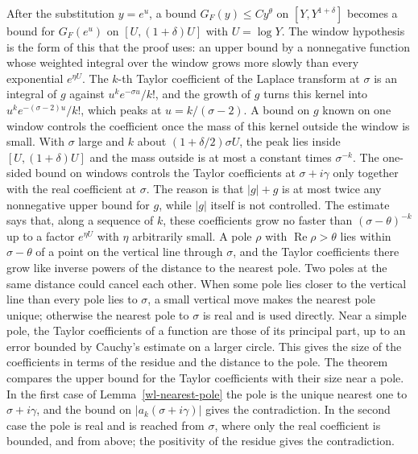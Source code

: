 After the substitution $y=e^u$, a bound $G_F(y)\leq Cy^\theta$ on $[Y,Y^{1+\delta}]$ becomes a bound for $G_F(e^u)$ on $[U,(1+\delta)U]$ with $U=\log Y$. The window hypothesis is the form of this that the proof uses: an upper bound by a nonnegative function whose weighted integral over the window grows more slowly than every exponential $e^{\eta U}$.
The $k$-th Taylor coefficient of the Laplace transform at $\sigma$ is an integral of $g$ against $u^ke^{-\sigma u}/k!$, and the growth of $g$ turns this kernel into $u^ke^{-(\sigma-2)u}/k!$, which peaks at $u=k/(\sigma-2)$. A bound on $g$ known on one window controls the coefficient once the mass of this kernel outside the window is small. With $\sigma$ large and $k$ about $(1+\delta/2)\sigma U$, the peak lies inside $[U,(1+\delta)U]$ and the mass outside is at most a constant times $\sigma^{-k}$.
The one-sided bound on windows controls the Taylor coefficients at $\sigma+i\gamma$ only together with the real coefficient at $\sigma$. The reason is that $|g|+g$ is at most twice any nonnegative upper bound for $g$, while $|g|$ itself is not controlled. The estimate says that, along a sequence of $k$, these coefficients grow no faster than $(\sigma-\theta)^{-k}$ up to a factor $e^{\eta U}$ with $\eta$ arbitrarily small.
A pole $\rho$ with $\operatorname{Re}\rho>\theta$ lies within $\sigma-\theta$ of a point on the vertical line through $\sigma$, and the Taylor coefficients there grow like inverse powers of the distance to the nearest pole. Two poles at the same distance could cancel each other. When some pole lies closer to the vertical line than every pole lies to $\sigma$, a small vertical move makes the nearest pole unique; otherwise the nearest pole to $\sigma$ is real and is used directly.
Near a simple pole, the Taylor coefficients of a function are those of its principal part, up to an error bounded by Cauchy's estimate on a larger circle. This gives the size of the coefficients in terms of the residue and the distance to the pole.
The theorem compares the upper bound for the Taylor coefficients with their size near a pole. In the first case of Lemma~\ref{wl-nearest-pole} the pole is the unique nearest one to $\sigma+i\gamma$, and the bound on $|a_k(\sigma+i\gamma)|$ gives the contradiction. In the second case the pole is real and is reached from $\sigma$, where only the real coefficient is bounded, and from above; the positivity of the residue gives the contradiction.
